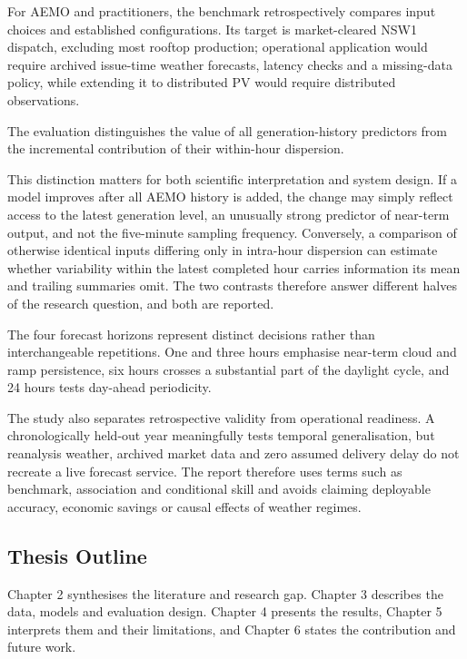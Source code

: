 For AEMO and practitioners, the benchmark retrospectively compares input choices and established configurations. Its target is market-cleared NSW1 dispatch, excluding most rooftop production; operational application would require archived issue-time weather forecasts, latency checks and a missing-data policy, while extending it to distributed PV would require distributed observations.

The evaluation distinguishes the value of all generation-history predictors from the incremental contribution of their within-hour dispersion.

This distinction matters for both scientific interpretation and system design. If a model improves after all AEMO history is added, the change may simply reflect access to the latest generation level, an unusually strong predictor of near-term output, and not the five-minute sampling frequency. Conversely, a comparison of otherwise identical inputs differing only in intra-hour dispersion can estimate whether variability within the latest completed hour carries information its mean and trailing summaries omit. The two contrasts therefore answer different halves of the research question, and both are reported.

The four forecast horizons represent distinct decisions rather than interchangeable repetitions. One and three hours emphasise near-term cloud and ramp persistence, six hours crosses a substantial part of the daylight cycle, and 24 hours tests day-ahead periodicity.

The study also separates retrospective validity from operational readiness. A chronologically held-out year meaningfully tests temporal generalisation, but reanalysis weather, archived market data and zero assumed delivery delay do not recreate a live forecast service. The report therefore uses terms such as benchmark, association and conditional skill and avoids claiming deployable accuracy, economic savings or causal effects of weather regimes.

\subsection{Thesis Outline}

Chapter 2 synthesises the literature and research gap. Chapter 3 describes the data, models and evaluation design. Chapter 4 presents the results, Chapter 5 interprets them and their limitations, and Chapter 6 states the contribution and future work.

